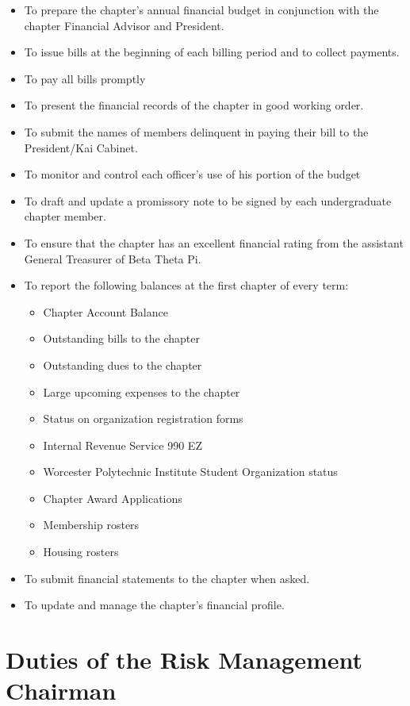 \begin{itemize}
\item To prepare the chapter’s annual financial budget in conjunction with the chapter Financial Advisor and President. 
\item To issue bills at the beginning of each billing period and to collect payments. 
\item To pay all bills promptly
\item To present the financial records of the chapter in good working order. 
\item To submit the names of members delinquent in paying their bill to the President/Kai Cabinet. 
\item To monitor and control each officer’s use of his portion of the budget 
\item To draft and update a promissory note to be signed by each undergraduate chapter member. 
\item To ensure that the chapter has an excellent financial rating from the assistant General Treasurer of Beta Theta Pi. 
\item To report the following balances at the first chapter of every term: 
\begin{itemize}

\item Chapter Account Balance 
\item Outstanding bills to the chapter
\item Outstanding dues to the chapter
\item Large upcoming expenses to the chapter
\item Status on organization registration forms 
\item Internal Revenue Service 990 EZ 
\item Worcester Polytechnic Institute Student Organization status 
\item Chapter Award Applications 
\item Membership rosters 
\item Housing rosters 
\end{itemize}
\item To submit financial statements to the chapter when asked. 
\item To update and manage the chapter’s financial profile.
\end{itemize}

\section{Duties of the Risk Management Chairman}
\label{sec:duties-of-the-risk-management-chairman}

